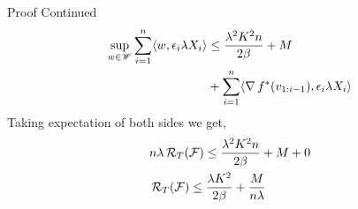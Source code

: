 \begin{frame}{Proof Continued}
    \begin{align*}
      \sup_{w \in \mathscr{W}} \sum_{i=1}^n \langle {w} , {\epsilon_i \lambda X_i} \rangle & \le \frac{\lambda^2 K^2 n}{2\beta} + M \\
      & + \sum_{i=1}^n \langle {\operatorname{\nabla}{f}^{*}(v_{1:i-1})} , {\epsilon_i \lambda X_i} \rangle
    \end{align*}
    Taking expectation of both sides we get,
    \begin{align*}
      & n\lambda\operatorname{\mathcal{R}}_T(\operatorname{\mathcal{F}}) \le \frac{\lambda^2 K^2 n}{2\beta} + M + 0\\
      & \operatorname{\mathcal{R}}_T(\operatorname{\mathcal{F}}) \le \frac{\lambda K^2}{2\beta} + \frac{M}{n\lambda}
    \end{align*}
\end{frame}
